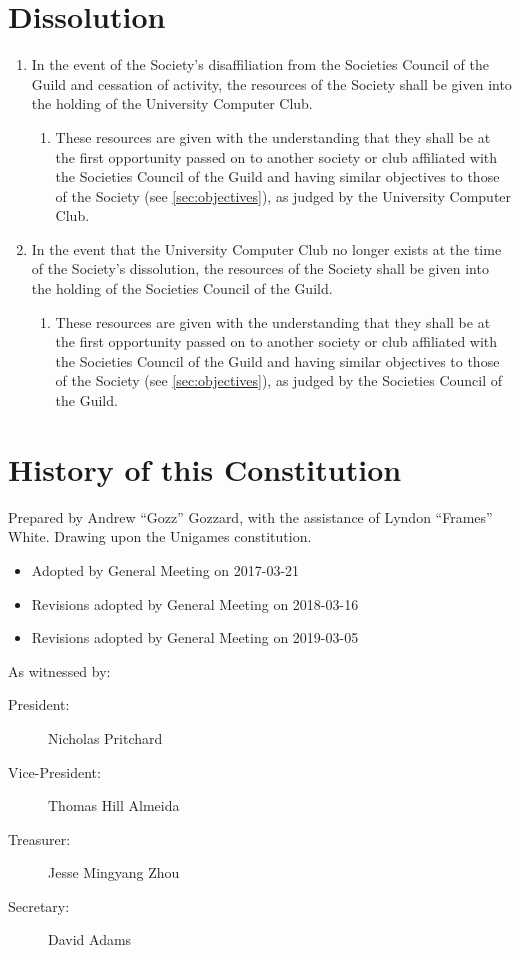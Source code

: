 \documentclass[a4paper]{article}
\newenvironment{enumsection}[1]{\section{#1} \begin{enumerate}[ref=\thesection.\theenumi]}{\end{enumerate}}
\begin{document}
\begin{enumsection}{Dissolution} \label{sec:dissolution}
    \item In the event of the Society's disaffiliation from the Societies Council of the Guild and cessation of activity, the resources of the Society shall be given into the holding of the University Computer Club.
    \begin{enumerate}
        \item These resources are given with the understanding that they shall be at the first opportunity passed on to another society or club affiliated with the Societies Council of the Guild and having similar objectives to those of the Society (see \cref{sec:objectives}), as judged by the University Computer Club.
    \end{enumerate}
    \item In the event that the University Computer Club no longer exists at the time of the Society's dissolution, the resources of the Society shall be given into the holding of the Societies Council of the Guild.
    \begin{enumerate}
        \item These resources are given with the understanding that they shall be at the first opportunity passed on to another society or club affiliated with the Societies Council of the Guild and having similar objectives to those of the Society (see \cref{sec:objectives}), as judged by the Societies Council of the Guild.
    \end{enumerate}
\end{enumsection}

\appendixpage

\appendix \section{History of this Constitution} \label{app:history}

\noindent Prepared by Andrew ``Gozz'' Gozzard, with the assistance of Lyndon ``Frames'' White. Drawing upon the Unigames constitution.

\medskip{}

\begin{itemize}
	\item[] Adopted by General Meeting on 2017-03-21
    \item[] Revisions adopted by General Meeting on 2018-03-16
    \item[] Revisions adopted by General Meeting on 2019-03-05
\end{itemize}

\medskip{}

\noindent As witnessed by:
\begin{description}
\item [{President:}] Nicholas Pritchard \hrulefill
\item [{Vice-President:}] Thomas Hill Almeida \hrulefill
\item [{Treasurer:}] Jesse Mingyang Zhou \hrulefill
\item [{Secretary:}] David Adams \hrulefill
\end{description}
\end{document}
